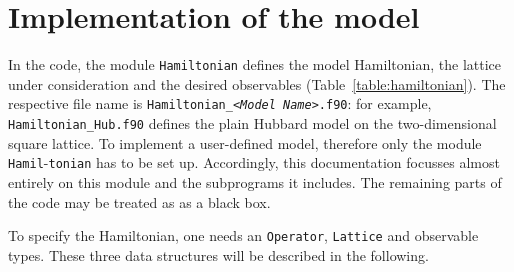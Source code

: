 \section{Implementation of the model} \label{sec:imp}
In the code, the module \texttt{Hamiltonian} defines the model Hamiltonian, the lattice under consideration and the desired observables (Table~\ref{table:hamiltonian}).
The respective file name is \texttt{Hamiltonian\_\textit{<Model Name>}.f90}: for example, \texttt{Hamiltonian\_Hub.f90} defines the plain Hubbard model on the two-dimensional square lattice. To implement a user-defined model, therefore only the module \texttt{Hamil}-\texttt{tonian} has to be set up. Accordingly, this documentation focusses almost entirely  on this module and the subprograms it includes. 
The remaining parts of the code may be treated as as a black box.  

To specify the Hamiltonian, one needs  an  \texttt{Operator},  \texttt{Lattice}   and  observable types. These three data structures will be described in the following. 

